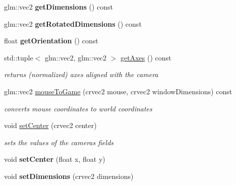 \begin{DoxyCompactItemize}
glm\+::vec2 {\bfseries get\+Dimensions} () const
\item 
\mbox{\label{classnta_1_1Camera2D_a6b3b7c18d66f680c05087b94214bc98f}} 
glm\+::vec2 {\bfseries get\+Rotated\+Dimensions} () const
\item 
\mbox{\label{classnta_1_1Camera2D_a5cf5e5e022f29952af085a63980e737c}} 
float {\bfseries get\+Orientation} () const
\item 
\mbox{\label{classnta_1_1Camera2D_a395b5bfa81b603a3d4e78d6c54aa8212}} 
std\+::tuple$<$ glm\+::vec2, glm\+::vec2 $>$ \hyperlink{classnta_1_1Camera2D_a395b5bfa81b603a3d4e78d6c54aa8212}{get\+Axes} () const
\begin{DoxyCompactList}\small\item\em returns (normalized) axes aligned with the camera \end{DoxyCompactList}\item 
\mbox{\label{classnta_1_1Camera2D_afb20fb9823724babdc8d18b17336169c}} 
glm\+::vec2 \hyperlink{classnta_1_1Camera2D_afb20fb9823724babdc8d18b17336169c}{mouse\+To\+Game} (crvec2 mouse, crvec2 window\+Dimensions) const
\begin{DoxyCompactList}\small\item\em converts mouse coordinates to world coordinates \end{DoxyCompactList}\item 
\mbox{\label{classnta_1_1Camera2D_a11a7edceed0964b375fbfe154b9a9895}} 
void \hyperlink{classnta_1_1Camera2D_a11a7edceed0964b375fbfe154b9a9895}{set\+Center} (crvec2 center)
\begin{DoxyCompactList}\small\item\em sets the values of the camera\textquotesingle{}s fields \end{DoxyCompactList}\item 
\mbox{\label{classnta_1_1Camera2D_a5e887ee36c95789e3455ab2f3bb3f568}} 
void {\bfseries set\+Center} (float x, float y)
\item 
\mbox{\label{classnta_1_1Camera2D_a3b133bef64504b488b04ce18e206544b}} 
void {\bfseries set\+Dimensions} (crvec2 dimensions)

\end{DoxyCompactItemize}
